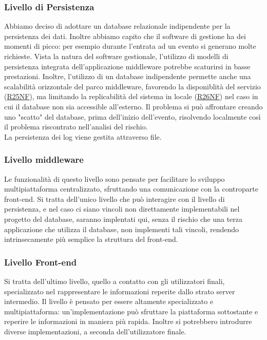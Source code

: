 \documentclass[a4paper]{article}
\begin{document}
\subsubsection{Livello di Persistenza}
Abbiamo deciso di adottare un database relazionale indipendente per la persistenza dei dati. Inoltre abbiamo capito che il software di gestione ha dei momenti di picco: per esempio durante l'entrata ad un evento si generano molte richieste. Vista la natura del software gestionale, l'utilizzo di modelli di persistenza integrata dell'applicazione middleware potrebbe scaturirsi in basse prestazioni. Inoltre, l'utilizzo di un database indipendente permette anche una scalabilità orizzontale del parco middleware, favorendo la disponiblità del servizio (\hyperlink{R25NF}{R25NF}), ma limitando la replicabilità del sistema in locale (\hyperlink{R26NF}{R26NF}) nel caso in cui il database non sia accessible all'esterno. Il problema si può affrontare creando uno "scatto" del database, prima dell'inizio dell'evento, risolvendo localmente così il problema riscontrato nell'analisi del rischio.\\La persistenza dei log viene gestita attraverso file.


\subsubsection{Livello middleware}
Le funzionalità di questo livello sono pensate per facilitare lo sviluppo multipiattaforma centralizzato, sfruttando una comunicazione con la controparte front-end. Si tratta dell'unico livello che può interagire con il livello di persistenza, e nel caso ci siano vincoli non direttamente implementabili nel progetto del database, saranno implentati qui, senza il rischio che una terza applicazione che utilizza il database, non implementi tali vincoli, rendendo intrinsecamente più semplice la struttura del front-end.

\subsubsection{Livello Front-end}
Si tratta dell'ultimo livello, quello a contatto con gli utilizzatori finali, specializzato nel rappresentare le informazioni reperite dallo strato server intermedio. Il livello è pensato per essere altamente specializzato e multipiattaforma: un'implementazione può sfruttare la piattaforma sottostante e reperire le informazioni in maniera più rapida. Inoltre si potrebbero introdurre diverse implementazioni, a seconda dell'utilizzatore finale.\\
\end{document}
